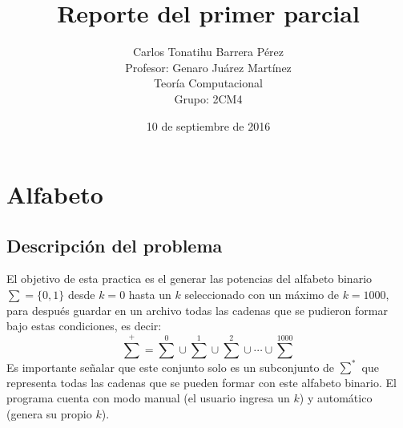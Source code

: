 \documentclass[12pt, titlepage]{article}
\title{Reporte del primer parcial}
\author{Carlos Tonatihu Barrera Pérez \\ Profesor: Genaro Juárez Martínez \\ Teoría Computacional \\ Grupo: 2CM4 }
\date{10 de septiembre de 2016}
\begin{document}
	\maketitle
	\tableofcontents
	\newpage
	
	\section{Alfabeto}
	\subsection{Descripción del problema}
	El objetivo de esta practica es el generar las potencias del alfabeto binario $ \sum = \lbrace 0, 1 \rbrace $ desde $k=0$ hasta un $k$ seleccionado con un máximo de $k=1000$, para después guardar en un archivo todas las cadenas que se pudieron formar bajo estas condiciones, es decir: 
	\[{\sum}^{+} = {\sum}^{0}\cup{\sum}^{1}\cup{\sum}^{2}\cup\cdots\cup{\sum}^{1000}\]
	Es importante señalar que este conjunto solo es un subconjunto de $ {\sum}^{*} $ que representa todas las cadenas que se pueden formar con este alfabeto binario.
	El programa cuenta con modo manual (el usuario ingresa un $k$) y automático (genera su propio $k$).
\end{document}
